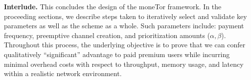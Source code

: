 \medskip \noindent \textbf{Interlude.}
This concludes the design of the moneTor framework.
In the proceeding sections, we describe steps taken to iteratively select and validate key parameters as well as the scheme as a whole.
Such parameters include: payment frequency, preemptive channel creation, and prioritization amounts ($\alpha, \beta$).
Throughout this process, the underlying objective is to prove that we can confer qualitatively ``significant'' advantage to paid premium users while incurring minimal overhead costs with respect to throughput, memory usage, and latency within a realistic network environment.

